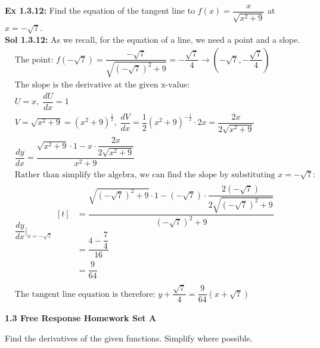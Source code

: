 \textbf{Ex 1.3.12: } Find the equation of the tangent line to $f(x) = \dfrac{x}{\sqrt{x^2 + 9}}$ at $x = -\sqrt{7}$. \\[11pt]
\textbf{Sol 1.3.12: } As we recall, for the equation of a line, we need a point and a slope. \begin{align*}
    & \text{The point: } f\left(-\sqrt{7}\right) = \dfrac{-\sqrt{7}}{\sqrt{\left(-\sqrt{7}\right)^2 + 9}} = -\dfrac{\sqrt{7}}{4} \rightarrow \left(-\sqrt{7}, -\dfrac{\sqrt{7}}{4}\right) \\[11pt]
    & \text{The slope is the derivative at the given x-value:} \\[11pt]
    & U = x, \; \dfrac{dU}{dx} = 1 \\[11pt]
    & V = \sqrt{x^2 + 9} = \left(x^2 + 9\right)^\frac{1}{2}, \; \dfrac{dV}{dx} = \dfrac{1}{2}\left(x^2 + 9\right)^{-\frac{1}{2}} \cdot 2x = \dfrac{2x}{2\sqrt{x^2 + 9}} \\[11pt]
    & \dfrac{dy}{dx} = \dfrac{\sqrt{x^2 + 9} \cdot 1 - x \cdot \dfrac{2x}{2\sqrt{x^2 + 9}}}{x^2 + 9} \\[11pt]
    & \text{Rather than simplify the algebra, we can find the slope by substituting } x = -\sqrt{7}: \\[11pt]
    & \dfrac{dy}{dx}\bigg|_{x = -\sqrt{7}} \begin{aligned}[t]
        & = \dfrac{\sqrt{\left(-\sqrt{7}\right)^2 + 9} \cdot 1 - \left(-\sqrt{7}\right) \cdot \dfrac{2\left(-\sqrt{7}\right)}{2\sqrt{\left(-\sqrt{7}\right)^2 + 9}}}{\left(-\sqrt{7}\right)^2 + 9} \\[11pt]
        & = \dfrac{4 - \dfrac{7}{4}}{16} \\[11pt]
        & = \dfrac{9}{64} 
    \end{aligned} \\[11pt]
    & \text{The tangent line equation is therefore: } \boxed{y + \dfrac{\sqrt{7}}{4} = \dfrac{9}{64}\left(x + \sqrt{7}\right)} 
\end{align*} 

\newpage

\textbf{\large{1.3 Free Response Homework Set A}} \par

Find the derivatives of the given functions. Simplify where possible. \par


